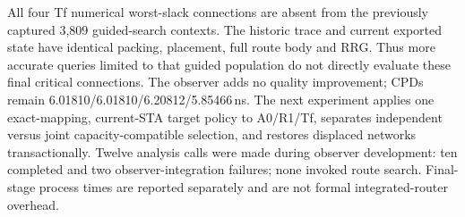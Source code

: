All four Tf numerical worst-slack connections are absent from the previously captured 3,809 guided-search contexts. The historic trace and current exported state have identical packing, placement, full route body and RRG. Thus more accurate queries limited to that guided population do not directly evaluate these final critical connections. The observer adds no quality improvement; CPDs remain 6.01810/6.01810/6.20812/5.85466\,ns. The next experiment applies one exact-mapping, current-STA target policy to A0/R1/Tf, separates independent versus joint capacity-compatible selection, and restores displaced networks transactionally. Twelve analysis calls were made during observer development: ten completed and two observer-integration failures; none invoked route search. Final-stage process times are reported separately and are not formal integrated-router overhead.

